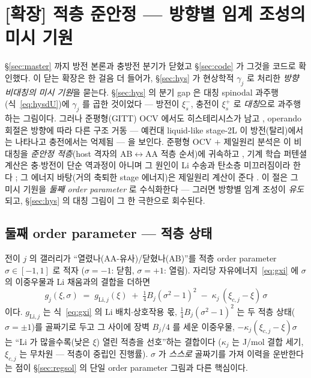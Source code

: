 \documentclass[11pt,a4paper]{article}
\begin{document}
\section{[확장] 적층 준안정 — 방향별 임계 조성의 미시 기원}\label{sec:stacking}
\S\ref{sec:master} 까지 방전 본론과 충방전 분기가 닫혔고 \S\ref{sec:code} 가 그것을 코드로 확인했다.
이 닫는 확장은 한 걸음 더 들어가, \S\ref{sec:hys} 가 현상학적 $\gamma_j$ 로 처리한 \emph{방향 비대칭의
미시 기원}을 묻는다. \S\ref{sec:hys} 의 분기 gap 은 대칭 spinodal 과주행(식~\eqref{eq:hysdU})에
$\gamma_j$ 를 곱한 것이었다 — 방전이 $\xi_s^-$, 충전이 $\xi_s^+$ 로 \emph{대칭}으로 과주행하는
그림이다. 그러나 준평형(GITT) OCV 에서도 히스테리시스가 남고 \cite{mercer2021,allart2018}, operando
회절은 방향에 따라 다른 구조 거동 — 예컨대 liquid-like stage-2L 이 방전(탈리)에서는 나타나고 충전에서는
억제됨 \cite{didier2020,schmitt2022} — 을 보인다. 준평형 OCV $+$ 제일원리 분석은 이 비대칭을 \emph{준안정
적층}(host 격자의 AB$\leftrightarrow$AA 적층 순서)에 귀속하고 \cite{mercer2021}, 기계 학습 퍼텐셜
계산은 충$\cdot$방전이 단순 역과정이 아니며 그 원인이 Li 수송과 탄소층 미끄러짐이라 한다 \cite{wang2025};
그 에너지 바탕(거의 축퇴한 stage 에너지)은 제일원리 계산이 준다 \cite{persson2010}. 이 절은 그 미시
기원을 \emph{둘째 order parameter} 로 수식화한다 — 그러면 방향별 임계 조성이 \emph{유도}되고,
\S\ref{sec:hys} 의 대칭 그림이 그 한 극한으로 회수된다.

\subsection{둘째 order parameter — 적층 상태}
전이 $j$ 의 갤러리가 ``열렸나(AA-유사)/닫혔나(AB)''를 적층 order parameter $\sigma\in[-1,1]$ 로 적자
($\sigma=-1$: 닫힘, $\sigma=+1$: 열림). 자리당 자유에너지~\eqref{eq:gxi} 에 $\sigma$ 의 이중우물과 Li
채움과의 결합을 더하면
\begin{equation}
g_j(\xi,\sigma)\;=\;g_{\mathrm{Li},j}(\xi)
\;+\;\tfrac14 B_j(\sigma^2-1)^2
\;-\;\kappa_j\,(\xi_{c,j}-\xi)\,\sigma
\label{eq:gcoupled}
\end{equation}
이다. $g_{\mathrm{Li},j}$ 는 식~\eqref{eq:gxi} 의 Li 배치$\cdot$상호작용 몫, $\tfrac14 B_j(\sigma^2-1)^2$
는 두 적층 상태($\sigma=\pm1$)를 골짜기로 두고 그 사이에 장벽 $B_j/4$ 를 세운 이중우물,
$-\kappa_j(\xi_{c,j}-\xi)\sigma$ 는 ``Li 가 많을수록(낮은 $\xi$) 열린 적층을 선호''하는 결합이다
($\kappa_j$ 는 J/mol 결합 세기, $\xi_{c,j}$ 는 무차원 — 적층이 중립인 진행률). $\sigma$ 가
\emph{스스로} 골짜기를 가져 이력을 운반한다는 점이 \S\ref{sec:regsol} 의 단일 order parameter 그림과
다른 핵심이다.
\end{document}
